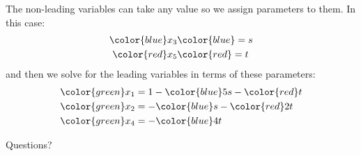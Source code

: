 \documentclass{beamer}
\begin{document}
\begin{frame}
  The non-leading variables can take any value so we assign parameters to them.\vfill
  In this case:
  \begin{align*}
    {\color{blue}x_3} &{\color{blue}= s}\\
    {\color{red}x_5} &{\color{red}= t}
  \end{align*}
  and then we solve for the leading variables in terms of these parameters:
  \begin{align*}
    {\color{green}x_1} &= 1-{\color{blue}5s}-{\color{red}t}\\
    {\color{green}x_2} &= -{\color{blue}s}-{\color{red}2t}\\
    {\color{green}x_4} &= -{\color{blue}4t}
  \end{align*}
\end{frame}

\begin{frame}
  Questions?
\end{frame}
\end{document}
